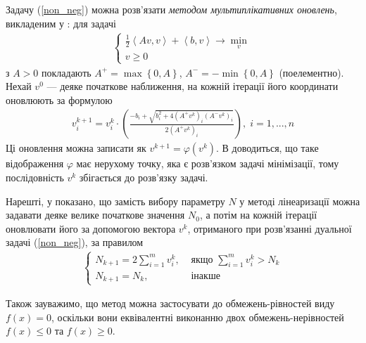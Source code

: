 \documentclass{extreport}
\begin{document}
Задачу (\ref{non_neg}) можна розв'язати \emph{методом мультиплікативних оновлень}, викладеним у \cite{3}:
для задачі
\begin{gather*}
    \begin{cases}
        \frac{1}{2}\left<A v, v\right> + \left<b, v \right> \to \underset{v}{\min} \\
        v \geq 0
    \end{cases}
\end{gather*}
з $A > 0$ покладають $A^{+} = \max\left\{0, A\right\}$, $A^{-} = -\min\left\{0, A\right\}$ (поелементно).
Нехай $v^{0}$ --- деяке початкове наближення, на кожній ітерації його координати оновлюють за формулою
\begin{gather*}
    v^{k+1}_i = v^{k}_i \cdot \left(\frac{
        - b_i + \sqrt{b_i^2 + 4 \left(A^+ v^{k}\right)_i \left(A^- v^{k}\right)_i}
    }{
        2 \left(A^+ v^{k}\right)_i
    }\right), \; i = 1, ..., n
\end{gather*}
Ці оновлення можна записати як $v^{k+1} = \varphi\left(v^{k}\right)$. В \cite{3} доводиться, що таке
відображення $\varphi$ має нерухому точку, яка є розв'язком задачі мінімізації, тому
послідовність $v^{k}$ збігається до розв'язку задачі.

Нарешті, у \cite{1} показано, що замість вибору параметру $N$ у методі лінеаризації
можна задавати деяке велике початкове значення $N_0$, а потім на кожній ітерації оновлювати його
за допомогою вектора $v^k$, отриманого при розв'язанні дуальної задачі (\ref{non_neg}), за правилом
\begin{gather*}
    \begin{cases}
        N_{k+1} = 2\sum\limits_{i=1}^m v^k_i, & \text{ якщо } \sum\limits_{i=1}^m v^k_i > N_k \\
        N_{k+1} = N_k, & \text{ інакше}
    \end{cases}
\end{gather*}

Також зауважимо, що метод можна застосувати до обмежень-рівностей виду $f(x) = 0$,
оскільки вони еквівалентні виконанню двох обмежень-нерівностей $f(x) \leq 0$ та $f(x) \geq 0$.
\end{document}
